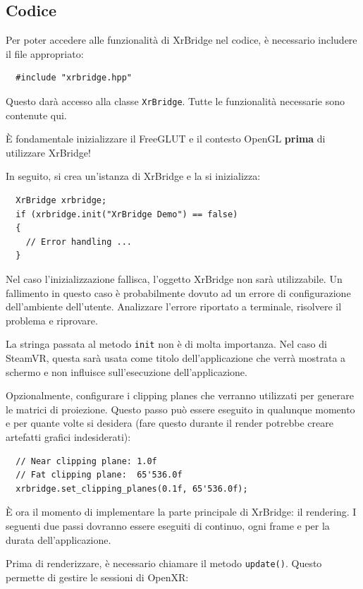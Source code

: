 \documentclass[twoside]{supsistudent}
\begin{document}
\subsection{Codice}

Per poter accedere alle funzionalità di XrBridge nel codice, è necessario includere il file appropriato:

\begin{verbatim}
  #include "xrbridge.hpp"
\end{verbatim}

Questo darà accesso alla classe \texttt{XrBridge}. Tutte le funzionalità necessarie sono contenute qui.

È fondamentale inizializzare il FreeGLUT e il contesto OpenGL \textbf{prima} di utilizzare XrBridge!

In seguito, si crea un'istanza di XrBridge e la si inizializza:

\begin{verbatim}
  XrBridge xrbridge;
  if (xrbridge.init("XrBridge Demo") == false)
  {
    // Error handling ...
  }
\end{verbatim}

Nel caso l'inizializzazione fallisca, l'oggetto XrBridge non sarà utilizzabile. Un fallimento in questo caso è probabilmente dovuto ad un errore di configurazione dell'ambiente dell'utente. Analizzare l'errore riportato a terminale, risolvere il problema e riprovare.

La stringa passata al metodo \texttt{init} non è di molta importanza. Nel caso di SteamVR, questa sarà usata come titolo dell'applicazione che verrà mostrata a schermo e non influisce sull'esecuzione dell'applicazione.

Opzionalmente, configurare i clipping planes che verranno utilizzati per generare le matrici di proiezione. Questo passo può essere eseguito in qualunque momento e per quante volte si desidera (fare questo durante il render potrebbe creare artefatti grafici indesiderati):

\begin{verbatim}
  // Near clipping plane: 1.0f
  // Fat clipping plane:  65'536.0f
  xrbridge.set_clipping_planes(0.1f, 65'536.0f);
\end{verbatim}

È ora il momento di implementare la parte principale di XrBridge: il rendering. I seguenti due passi dovranno essere eseguiti di continuo, ogni frame e per la durata dell'applicazione.

Prima di renderizzare, è necessario chiamare il metodo \texttt{update()}. Questo permette di gestire le sessioni di OpenXR:
\end{document}

